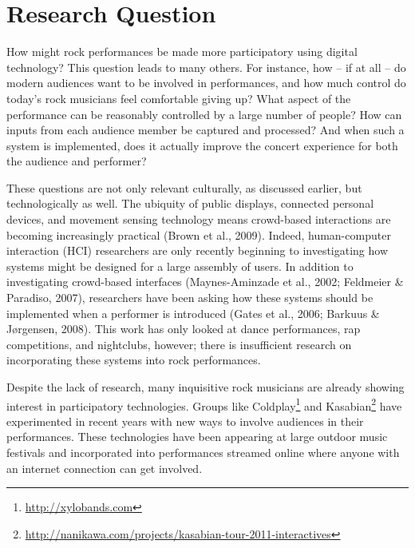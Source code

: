 \section{Research Question}

How might rock performances be made more participatory using digital technology? This question leads to many others. For instance, how -- if at all -- do modern audiences want to be involved in performances, and how much control do today's rock musicians feel comfortable giving up? What aspect of the performance can be reasonably controlled by a large number of people? How can inputs from each audience member be captured and processed? And when such a system is implemented, does it actually improve the concert experience for both the audience and performer?

These questions are not only relevant culturally, as discussed earlier, but technologically as well. The ubiquity of public displays, connected personal devices, and movement sensing technology means crowd-based interactions are becoming increasingly practical (Brown et al., 2009). Indeed, human-computer interaction (HCI) researchers are only recently beginning to investigating how systems might be designed for a large assembly of users. In addition to investigating crowd-based interfaces (Maynes-Aminzade et al., 2002; Feldmeier \& Paradiso, 2007), researchers have been asking how these systems should be implemented when a performer is introduced (Gates et al., 2006; Barkuus \& J{\o}rgensen, 2008). This work has only looked at dance performances, rap competitions, and nightclubs, however; there is insufficient research on incorporating these systems into rock performances.

Despite the lack of research, many inquisitive rock musicians are already showing interest in participatory technologies. Groups like Coldplay\footnote{\url{http://xylobands.com}} and Kasabian\footnote{\url{http://nanikawa.com/projects/kasabian-tour-2011-interactives}} have experimented in recent years with new ways to involve audiences in their performances. These technologies have been appearing at large outdoor music festivals and incorporated into performances streamed online where anyone with an internet connection can get involved.

